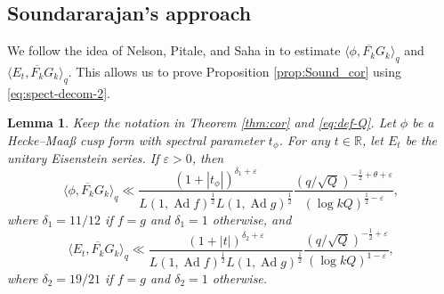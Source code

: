 \documentclass[12pt,reqno]{amsart}
\newtheorem{lem}[thm]{Lemma}
\theoremstyle{remark}
\DeclareMathOperator{\ad}{Ad}
\numberwithin{equation}{section}
\begin{document}
\subsection{Soundararajan's approach}\label{subsec: Sound-cor} 
   We follow the idea of Nelson, Pitale, and Saha in \cite{NPS} to estimate $\langle\phi, \overline{F_k}G_k \rangle_q$ and $\langle E_t, \overline{F_k}G_k  \rangle_q$. This allows us to prove Proposition \ref{prop:Sound_cor} using \eqref{eq:spect-decom-2}.
   \begin{lem}\label{lem:Sound_cor} Keep the notation in Theorem \ref{thm:cor} and \eqref{eq:def-Q}. Let $\phi$ be a Hecke--Maa{\ss} cusp form with spectral parameter $ t_\phi $. For any $t \in \mathbb{R}$, let $E_t$ be the unitary Eisenstein series.  
    If $\varepsilon > 0$, then 
		\begin{equation}\label{eq:sound_maass}
			\langle \phi, \overline{F_k}G_k \rangle_q \ll \frac{(1+|t_{\phi}|)^{\delta_1+\varepsilon}}{L(1, \ad f)^{\frac{1}{2}}L(1, \ad g)^{\frac{1}{2}}}\frac{(q/\sqrt{Q})^{-\frac{1}{2}+\theta+\varepsilon}}{(\log kQ)^{\frac{1}{2}-\varepsilon}},
		\end{equation}
    where $\delta_1 = 11/12$ if $f=g$ and $\delta_1 = 1$ otherwise, 
		and 
		\begin{equation}\label{eq:sound_Eis}
			\langle E_t, \overline{F_k}G_k \rangle_q \ll \frac{(1+|t|)^{\delta_2+\varepsilon}}{L(1, \ad f)^{\frac{1}{2}}L(1, \ad g)^{\frac{1}{2}}}\frac{(q/\sqrt{Q})^{-\frac{1}{2}+\varepsilon}}{(\log kQ)^{1-\varepsilon}},
		\end{equation}
        where $\delta_2 = 19/21$ if $f=g$ and $\delta_2 = 1$ otherwise.
	\end{lem}
\end{document}

